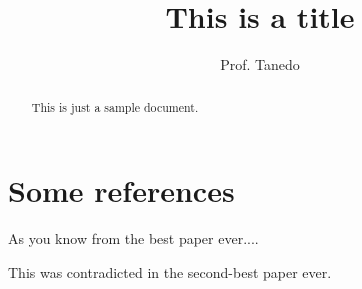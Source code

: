 \documentclass[12pt]{article}
\begin{document}
\title{This is a title}
\author{
    Prof. Tanedo
}

    

\maketitle

\begin{abstract}
    This is just a sample document.
\end{abstract}

\section{Some references}

As you know from the best paper ever...\cite{test1}.

This was contradicted in the second-best paper ever\cite{test2}.



\end{document}
